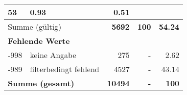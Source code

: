 \begin{longtable}{lXrrr}
       \num{53} &
       \num[round-mode=places,round-precision=2]{0,93} &
         \num[round-mode=places,round-precision=2]{0,51} \\
     \midrule
     \multicolumn{2}{l}{Summe (gültig)} &
       \textbf{\num{5692}} &
     \textbf{100} &
       \textbf{\num[round-mode=places,round-precision=2]{54,24}} \\
     \multicolumn{5}{l}{\textbf{Fehlende Werte}}\\
       -998 &
       keine Angabe &
         \num{275} &
        - &
         \num[round-mode=places,round-precision=2]{2,62} \\
       -989 &
       filterbedingt fehlend &
         \num{4527} &
        - &
         \num[round-mode=places,round-precision=2]{43,14} \\
     \midrule
     \multicolumn{2}{l}{\textbf{Summe (gesamt)}} &
          \textbf{\num{10494}} &
        \textbf{-} &
        \textbf{100} \\
     \bottomrule
     \end{longtable}
     
